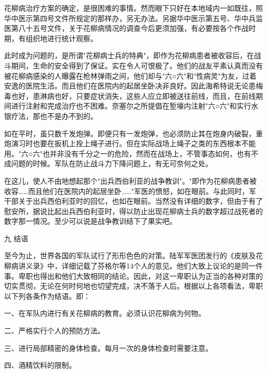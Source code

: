 \documentclass[12pt,UTF8]{ctexbook}
\begin{document}
花柳病治疗方案的确定，是很困难的事情。然而眼下只好在本地域内一如既往，照华中医示第四号文件所规定的那样办，另无办法。另据华中医示第五号、华中兵监医第八十五号文件，关于花柳病情况的调查今后更须加强，有必要按各个作战时期，有组织地进行统计观察。





此时成为问题的，是所谓"花柳病士兵的特典"，即作为花柳病患者被收容后，在战斗期间，生命的安全得到了保证。实在令人可恨极了。他们的战友平素认真而没有被花柳病感染的人曝露在枪林弹雨之间，他们却与"六○六"和"性病灵"为友，过着安逸的医院生活。而且他们在医院内的起居坐卧决非良好。因此海希特说无论患梅毒也好，患淋病也好，只要症状消失，这些人应立即被送往前线，而且，在前线期间进行注射和完成治疗也不困难。奈塞尔之所提倡在堑壕内注射"六○六"和实行水银疗法，那也不是办不到的。



如在平时，虽只数千发炮弹。即便只有一发炮弹，也必须防止其在炮身内破裂，重炮演习时也要在扳机上拴上绳子进行。但在实际战场上绳子之类的东西根本不能用。"六○六"也并非没有千分之一的危险，然而在战场上，不管事态如何，也有不成问题的时候。军队在防止战斗力下降问题上，有无可奈何之处。



在这儿，使人不由地想起那个"出兵西伯利亚的战争教训"。"即作为花柳病患者被收容……而且他们在医院内的起居坐卧……"军医的愤怒，如在眼前。与此同时，军干部关于出兵西伯利亚时的回忆，也如在眼前。当然没有详细的数字，但由于有了慰安所，据说比起出兵西伯利亚时，得以防止出现花柳病士兵的数字超过战死者的数字那一情况。至少可以说是战争教训结下了果实吧。



九 结语



至今为止，世界各国的军队试行了形形色色的对策。陆军军医团发行的《皮肤及花柳病讲义录》中，详细记载了芬格尔等14个人的意见。他们大致上议论的是同一件事。卑职也得出和他们大致相同的结论。因此，对这一卑职认为正当的各种对策的切实贯彻，无论在何时何地也切望完成，决不落于人后。根据以上各项看法，卑职以下列各条作为结语。即：



一、在军队内进行有关花柳病的教育。必须认识花柳病为何物。



二、严格实行个人的预防方法。



三、进行局部精密的身体检查。每月一次的身体检查时需要注意。



四、酒精饮料的限制。
\end{document}
